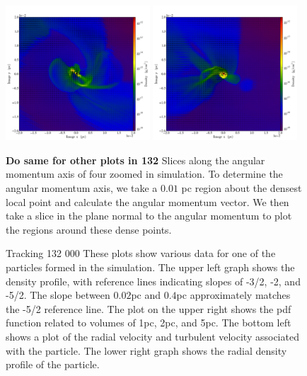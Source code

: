 \documentclass{emulateapj}
\begin{document}
\begin{figure}
\includegraphics[width=0.48\textwidth]{movie_disk_0132_0002.png}
\includegraphics[width=0.48\textwidth]{movie_disk_0132_0004.png}
\caption{{\bf Do same for other plots in 132} Slices along the angular momentum axis of four zoomed in simulation. To determine the angular momentum axis, we take a $0.01$ pc region about the densest local point and calculate the angular momentum vector. We then take a slice in the plane normal to the angular momentum to plot the regions around these dense points. \label{fig:snapshots 2}}
\end{figure}

\begin{figure}
\caption{Tracking 132 000  These plots show various data for one of the particles formed in the simulation.  The upper left graph shows the density profile, with reference lines indicating slopes of -3/2, -2, and -5/2.  The slope between $0.02$pc and $0.4$pc approximately matches the -5/2 reference line.  The plot on the upper right shows the pdf function related to volumes of 1pc, 2pc, and 5pc.  The bottom left shows a plot of the radial velocity and turbulent velocity associated with the particle.  The lower right graph shows the radial density profile of the particle.    \label{fig:132 000 graphs}}
\end{figure}
\end{document}
